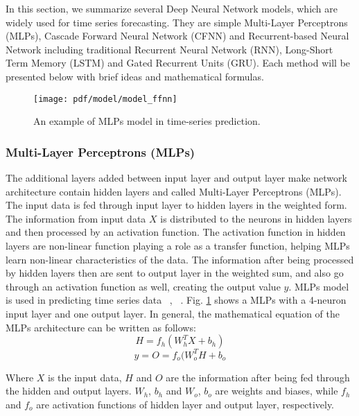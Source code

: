 \documentclass[../main.tex]{subfiles}
\begin{document}
	 In this section, we summarize several Deep Neural Network models, which are widely used for time series forecasting. They are simple Multi-Layer Perceptrons (MLPs), Cascade Forward Neural Network (CFNN) and Recurrent-based Neural Network including traditional Recurrent Neural Network (RNN), Long-Short Term Memory (LSTM) and Gated Recurrent Units (GRU). Each method will be presented below with brief ideas and mathematical formulas. 

\begin{figure}[!ht] 
   \centering
   \texttt{[image: pdf/model/model\_ffnn]}
  \caption{An example of MLPs model in time-series prediction.} 
  \label{fig_model_mlp} 
\end{figure}

\subsubsection{Multi-Layer Perceptrons (MLPs)}
\label{model_mlp}
	
	The additional layers added between input layer and output layer make network architecture contain hidden layers and called Multi-Layer Perceptrons (MLPs). The input data is fed through input layer to hidden layers in the weighted form. The information from input data $X$ is distributed to the neurons in hidden layers and then processed by an activation function. The activation function in hidden layers are non-linear function playing a role as a transfer function, helping MLPs learn non-linear characteristics of the data. The information after being processed by hidden layers then are sent to output layer in the weighted sum, and also go through an activation function as well, creating the output value $y$. MLPs model is used in predicting time series data ~\cite{azoff1994neural}, ~\cite{koskela1996time}.  Fig. \ref{fig_model_mlp} shows a MLPs with a 4-neuron input layer and one output layer. In general,  the mathematical equation of the MLPs architecture can be written as follows:
\begin{equation} \label{eq_mlp_1}
H = f_h(W_h^TX + b_h)
\end{equation}
\begin{equation} \label{eq_mlp_2}
y = O = f_o(W_o^TH + b_o
\end{equation}

Where $X$ is the input data, $H$ and $O$ are the information after being fed through the hidden and output layers. $W_h$, $b_h$ and $W_o$, $b_o$ are weights and biases, while $f_h$ and $f_o$ are activation functions of hidden layer and output layer, respectively.
\end{document}

